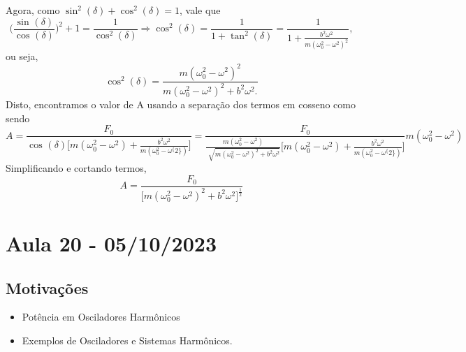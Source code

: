 \documentclass{article}
\begin{document}
Agora, como \(\sin^{2}{(\delta )} + \cos^{2}{(\delta )} = 1\), vale que 
\[
  \biggl(\frac{\sin^{}{(\delta )}}{\cos^{}{(\delta )}}\biggr)^{2} + 1 = \frac{1}{\cos^{2}{(\delta )}} \Rightarrow \cos^{2}{(\delta )} = \frac{1}{1+\tan^{2}{(\delta )}} = \frac{1}{1+\frac{b^{2}\omega ^{2}}{m(\omega_{0}^{2}-\omega ^{2})^{2}}},
\]
ou seja, 
\[
  \cos^{2}{(\delta )} = \frac{m(\omega_{0}^{2}-\omega ^{2})^{2}}{m(\omega_{0}^{2}-\omega ^{2})^{2}+b^{2}\omega ^{2}.}
\]
Disto, encontramos o valor de A usando a separação dos termos em cosseno como sendo 
\[
  A = \frac{F_{0}}{\cos^{}{(\delta )}\biggl[m(\omega_{0}^{2}-\omega ^{2})+\frac{b^{2}\omega ^{2}}{m(\omega_{0}^{2}-\omega ^\{2\})}\biggr]} = \frac{F_{0}}{\frac{m(\omega_{0}^{2}-\omega ^{2})}{\sqrt[]{m(\omega_{0}^{2}-\omega ^{2})^{2}+b^{2}\omega ^{2}}}\biggl[m(\omega_{0}^{2}-\omega ^{2})+\frac{b^{2}\omega ^{2}}{m(\omega_{0}^{2}-\omega ^\{2\})}\biggr]}m(\omega_{0}^{2}-\omega ^{2})
\]
Simplificando e cortando termos, 
\[
  A = \frac{F_{0}}{\biggl[m(\omega_{0}^{2}-\omega ^{2})^{2}+b^{2}\omega ^{2}\biggr]^{\frac{1}{2}}}
\]
\newpage

\section{Aula 20 - 05/10/2023}
\subsection{Motivações}
\begin{itemize}
  \item Potência em Osciladores Harmônicos
  \item Exemplos de Osciladores e Sistemas Harmônicos.
\end{itemize}
\end{document}
